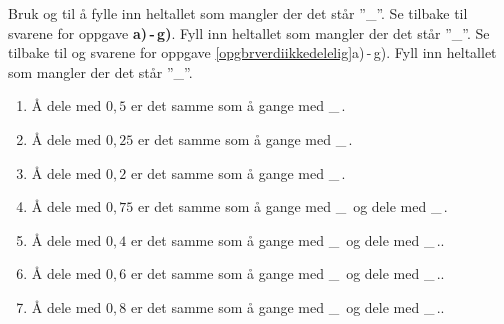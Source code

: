 Bruk  og  til å fylle inn heltallet som mangler der det står ''\_''.
Se tilbake til svarene for oppgave \textbf{a)\,-\,g)}. Fyll inn heltallet som mangler der det står ''\_''.
\newpage
{}
Se tilbake til  og svarene for oppgave \ref{opgbrverdiikkedelelig}a)\,-\,g).
Fyll inn heltallet som mangler der det står ''\_''.
{\renewcommand{\labelenumi}{(\alph{enumi})}
	\begin{enumerate}
		\item Å dele med $ 0,5 $ er det samme som å gange med \_\,.
		\item Å dele med $ 0,25 $ er det samme som å gange med \_\,.
		\item Å dele med $ 0,2 $ er det samme som å gange med \_\,.
		\item Å dele med $ 0,75 $ er det samme som å gange med \_\, og dele med \_\,.
		\item Å dele med $ 0,4 $ er det samme som å gange med \_\, og dele med \_\,..
		\item Å dele med $ 0,6 $ er det samme som å gange med \_\, og dele med \_\,..
		\item Å dele med $ 0,8 $ er det samme som å gange med \_\, og dele med \_\,..	
\end{enumerate} }

\newpage



